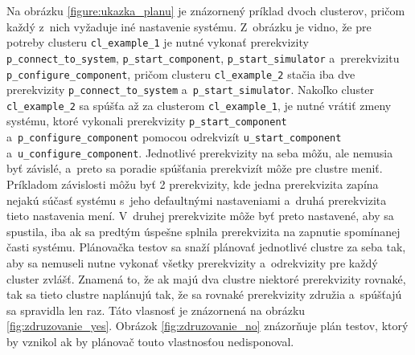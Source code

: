 Na obrázku \ref{figure:ukazka_planu} je znázornený príklad dvoch clusterov, pričom každý z~nich vyžaduje iné nastavenie systému. 
Z~obrázku je vidno, že pre potreby clusteru \texttt {cl\_example\_1} je nutné vykonať prerekvizity \texttt{p\_connect\_to\_system}, 
\texttt{p\_start\_component}, \texttt{p\_start\_simulator} a~prerekvizitu \texttt{p\_configure\_component},
pričom clusteru \texttt{cl\_example\_2} stačia iba dve prerekvizity \texttt{p\_connect\_to\_system} a~\texttt{p\_start\_simulator}.
Nakoľko cluster \texttt{cl\_example\_2} sa spúšťa až za clusterom \texttt{cl\_example\_1}, je nutné vrátiť zmeny systému, ktoré vykonali prerekvizity 
\texttt{p\_start\_component} a~\texttt{p\_configure\_component} pomocou odrekvizít \texttt{u\_start\_component} a~\texttt{u\_configure\_component}.
Jednotlivé prerekvizity na seba môžu, ale nemusia byť závislé, a~preto sa poradie spúšťania prerekvizít môže pre clustre meniť.
Príkladom závislosti môžu byť 2 prerekvizity, kde jedna prerekvizita zapína nejakú súčasť systému s~jeho defaultnými nastaveniami a~druhá prerekvizita 
tieto nastavenia mení. V~druhej prerekvizite môže byť preto nastavené, aby sa spustila, iba ak sa predtým úspešne splnila prerekvizita na zapnutie 
spomínanej časti systému.
Plánovačka testov sa snaží plánovať jednotlivé clustre za seba tak, aby sa nemuseli nutne vykonať všetky prerekvizity a~odrekvizity pre každý cluster zvlášť.
Znamená to, že ak majú dva clustre niektoré prerekvizity rovnaké, tak sa tieto clustre naplánujú tak, že sa rovnaké prerekvizity združia a~spúšťajú sa spravidla len raz. 
Táto vlasnosť je znázornená na obrázku \ref{fig:zdruzovanie_yes}. Obrázok \ref{fig:zdruzovanie_no} znázorňuje plán testov,
ktorý by vznikol ak by plánovač touto vlastnosťou nedisponoval.

\begin{minipage}{\textwidth}
\begin{parcolumns}{2}

\colplacechunks
\end{parcolumns}
\end{minipage}


